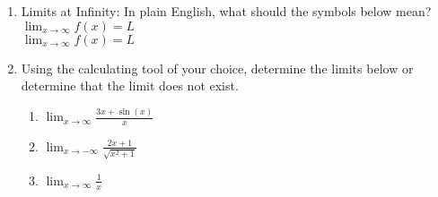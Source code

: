 \documentclass[11pt,fleqn]{article}
\begin{document}
\setlength{\parindent}{0cm}
\renewcommand{\headrulewidth}{0pt}
\newcommand{\blank}[1]{\rule{#1}{0.75pt}}
\renewcommand{\d}{\displaystyle}
\vspace*{-0.7in}
\begin{center}
 {\large{ }}
\end{center}
 \begin{enumerate}
 \item Limits at Infinity: In plain English, what should the symbols below mean?\\
 
 $\displaystyle{\lim_{x \to \infty} f(x) = L }$ \\
 
 $\displaystyle{\lim_{x \to \infty} f(x) = L }$
 
 \item Using the calculating tool of your choice, determine the limits below or determine that the limit does not exist.\\
 	\begin{enumerate}
	\item $\displaystyle{\lim_{x \to \infty} \frac{3x+ \sin(x)}{x}}$
	\vfill
	\item $\displaystyle{\lim_{x \to -\infty} \frac{2x+1}{\sqrt{x^2+1}}}$
	\vfill
	\item $\displaystyle{\lim_{x \to \infty} \frac{1}{x}}$
	\vfill
	\end{enumerate}
 
 \end{enumerate}
\end{document}
